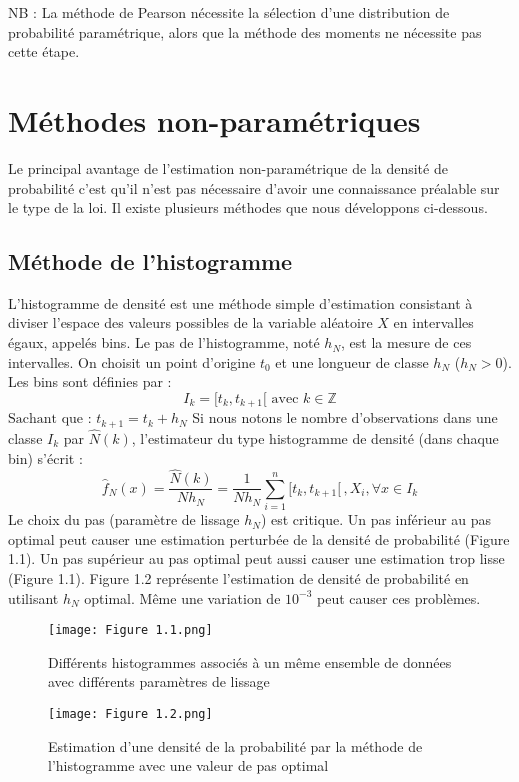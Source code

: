 NB : La méthode de Pearson nécessite la sélection d'une distribution de probabilité paramétrique, alors que la méthode des moments ne nécessite pas cette étape.

\section{Méthodes non-paramétriques}
Le principal avantage de l'estimation non-paramétrique de la densité de probabilité c'est qu’il n’est pas nécessaire d’avoir une connaissance préalable sur le type de la loi. Il existe plusieurs méthodes que nous développons ci-dessous.
\subsection{Méthode de l’histogramme}
L'histogramme de densité est une méthode simple d'estimation consistant à diviser l'espace des valeurs possibles de la variable aléatoire $X$ en intervalles égaux, appelés bins. Le pas de l'histogramme, noté $h_N$, est la mesure de ces intervalles.
\newline
On choisit un point d’origine $t_0$ et une longueur de classe $h_N$ ($h_N > 0$). Les bins sont définies par :
\begin{equation}
I_k=[t_k,t_{k+1} [\text{ avec } k \in \mathbb{Z}
\end{equation}
$\text{Sachant que : } t_{k+1}=t_k+h_N$
\newline
Si nous notons le nombre d’observations dans une classe $I_k$ par $\hat{N}(k)$, l’estimateur du type histogramme de densité (dans chaque bin) s’écrit :
\begin{equation}
{\hat f}_{N}(x) = \frac{\hat{N}(k)}{N h_N} = \frac{1}{N h_N} \sum_{i=1}^n [t_k, t_{k+1}\lbrack\,, X_i, \forall x \in I_k
\end{equation}
Le choix du pas (paramètre de lissage $h_N$) est critique. Un pas inférieur au pas optimal peut causer une estimation perturbée de la densité de probabilité (Figure 1.1). Un pas supérieur au pas optimal peut aussi causer une estimation trop lisse (Figure 1.1). Figure 1.2 représente l'estimation de densité de probabilité en utilisant $h_N$ optimal. 
\newline 
Même une variation de $10^{-3}$ peut causer ces problèmes.
\begin{figure}[!ht]
  \centering
  \texttt{[image: Figure 1.1.png]}
  \caption{Différents histogrammes associés à un même ensemble de données avec différents paramètres de lissage}
  \label{fig:hneleveetbas}
\end{figure}
\begin{figure}[!ht]
  \centering
  \texttt{[image: Figure 1.2.png]}
  \caption{Estimation d’une densité de la probabilité par la méthode de
l’histogramme avec une valeur de pas optimal}
  \label{fig:figure2}
\end{figure}
\newpage

